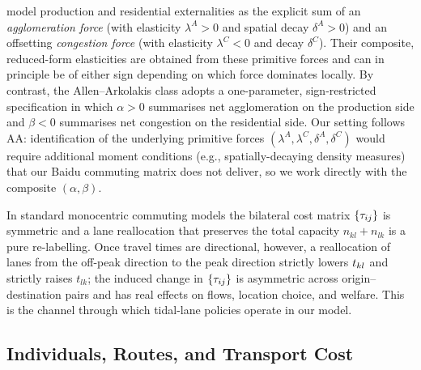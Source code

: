 \begin{remark}
\label{rem:AA_vs_Ahlfeldt}
\cite{Ahlfeldt2015} model production and residential externalities as
the explicit sum of an \emph{agglomeration force} (with elasticity
$\lambda^A>0$ and spatial decay $\delta^A>0$) and an offsetting
\emph{congestion force} (with elasticity $\lambda^C<0$ and decay
$\delta^C$).  Their composite, reduced-form elasticities are obtained
from these primitive forces and can in principle be of either sign
depending on which force dominates locally.  By contrast, the
Allen--Arkolakis class adopts a one-parameter, sign-restricted
specification in which $\alpha>0$ summarises net agglomeration on the
production side and $\beta<0$ summarises net congestion on the
residential side.  Our setting follows AA: identification of the
underlying primitive forces $(\lambda^A,\lambda^C,\delta^A,\delta^C)$
would require additional moment conditions (e.g., spatially-decaying
density measures) that our Baidu commuting matrix does not deliver,
so we work directly with the composite $(\alpha,\beta)$.
\end{remark}

\begin{remark}
In standard monocentric commuting models the bilateral cost matrix
$\{\tau_{ij}\}$ is symmetric and a lane reallocation that preserves the
total capacity $n_{kl}+n_{lk}$ is a pure re-labelling.  Once travel
times are directional, however, a reallocation of lanes from the
off-peak direction to the peak direction strictly lowers $t_{kl}$ and
strictly raises $t_{lk}$; the induced change in $\{\tau_{ij}\}$ is
asymmetric across origin--destination pairs and has real effects on
flows, location choice, and welfare.  This is the channel through
which tidal-lane policies operate in our model.
\end{remark}

\subsection{Individuals, Routes, and Transport Cost}\label{ssec:ind}

